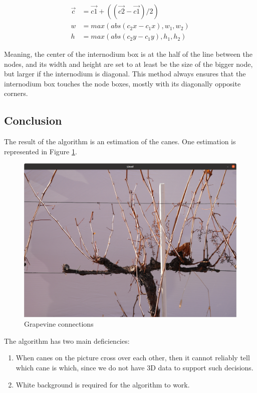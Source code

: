 \documentclass{PSAIE}%
\begin{document}
\begin{align*}
      \vec{c} & = \vec{c1} + ((\vec{c2} - \vec{c1}) / 2) \\
      w       & = max(abs(c_2x - c_1x), w_1, w_2)        \\
      h       & = max(abs(c_2y - c_1y), h_1, h_2)
\end{align*}

Meaning, the center of the internodium box is at the half of the line between the nodes, and its width and height
are set to at least be the size of the bigger node, but larger if the internodium is diagonal. This method always
ensures that the internodium box touches the node boxes, mostly with its diagonally opposite corners.

\subsection{Conclusion} \label{sec_build_canes_conclusion}
The result of the algorithm is an estimation of the canes. One estimation is represented in Figure
\ref{fig_grapevine_connections}.

\begin{figure}[h]
      \centering
      \includegraphics[scale=0.28]{images/grapevine_connections.png}
      \caption{Grapevine connections}
      \label{fig_grapevine_connections}
\end{figure}

The algorithm has two main deficiencies:
\begin{enumerate}
      \item When canes on the picture cross over each other, then it cannot reliably tell which cane is which, since
            we do not have 3D data to support such decisions.
      \item White background is required for the algorithm to work.
\end{enumerate}
\end{document}
